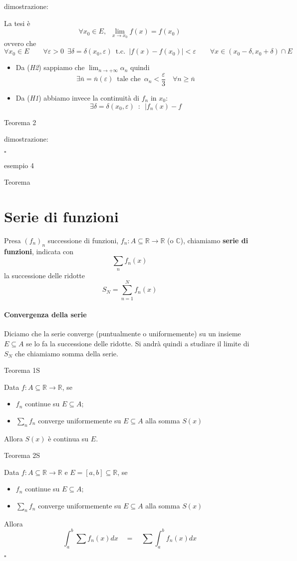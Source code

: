\documentclass[x11names]{article}
\newcommand*{\QEDB}{\null\nobreak\hfill\ensuremath{\square}}%
\newcommand{\esempio}[2]{
	\begin{es}{esempio #1}
		#2
	\end{es}
}
\newcommand{\teorema}[2]{
	\begin{center}
		\fboxsep11pt
		\colorbox{myred}{\begin{minipage}{5.75in}
				\begin{redes}{#1}
					#2
				\end{redes}
		\end{minipage}}
	\end{center}
}
\newcommand{\dimostrazione}[2]{
	\begin{dym}{dimostrazione: #1}
		#2
		\QEDB
	\end{dym}
}
\begin{document}
\dimostrazione{}{
La tesi è 
\[ 
\forall x_{0} \in E, \;\ \lim_{x\to x_{0}} f(x) = f(x_{0})
\]
ovvero che
\[ 
\forall x_{0} \in E \qquad \forall \varepsilon > 0 \;\ \exists \delta = \delta(x_{0},\varepsilon) \;\ \text{t.c.} \;\ |f(x) - f(x_{0})| < \varepsilon \qquad \forall x \in (x_{0}-\delta,x_{0}+\delta) \cap E 
\]
\begin{itemize}
	\item Da (\textit{H2}) sappiamo che \( \lim_{n\to + \infty} \alpha _{n}\) quindi 
	\[\exists \bar{n} = \bar{n}(\varepsilon) \;\ \text{tale che} \;\ \alpha_{n} < \frac{\varepsilon}{3} \quad \forall n\geq\bar{n}
	\]
	\item Da (\textit{H1}) abbiamo invece la continuità di \(f_{n}\) in \(x_{0}\):
	\[ 
	\exists \delta = \delta(x_{0},\varepsilon) \;\ : \;\ | f_{n}(x) - f
	\]
\end{itemize}
\teorema{Teorema 2}{}
\dimostrazione{}{}

\esempio{4}{}

\teorema{Teorema}{}


\section{Serie di funzioni}
Presa \((f_{n})_{n}\) successione di funzioni, \(f_{n}:A\subseteq \mathbb{R} \to \mathbb{R}\) (o \(\mathbb{C}\)), chiamiamo \textbf{serie di funzioni}, indicata con
\[ 
\sum_n f_{n}(x)
\]
la successione delle ridotte 
\[ 
S_{N} = \sum_{n=1}^N f_{n}(x)
\]
\paragraph{Convergenza della serie} Diciamo che la serie converge (puntualmente o uniformemente) su un insieme \(E\subseteq A\) se lo fa la successione delle ridotte. Si andrà quindi a studiare il limite di \(S_{N}\) che chiamiamo somma della serie.

\teorema{Teorema 1S}{
Data \(f:A\subseteq \mathbb{R} \to \mathbb{R}\), se
\begin{itemize}
	\item \(f_{n}\) continue su \(E\subseteq A\);
	\item \(\sum_n f_{n}\) converge uniformemente su \(E\subseteq A\) alla somma \(S(x)\)
\end{itemize}
Allora \(S(x)\) è continua su \(E\).}
\teorema{Teorema 2S}{
Data \(f:A\subseteq \mathbb{R} \to \mathbb{R}\) e \(E = [a,b]\subseteq \mathbb{R}\), se
\begin{itemize}
\item \(f_{n}\) continue su \(E\subseteq A\);
\item \(\sum_n f_{n}\) converge uniformemente su \(E\subseteq A\) alla somma \(S(x)\)
\end{itemize}
Allora
\[ 
\int_{a}^{b} \sum f_{n}(x)dx \quad  = \quad \sum \int_{a}^{b}  f_{n}(x)dx 
\]}

}
\end{document}
